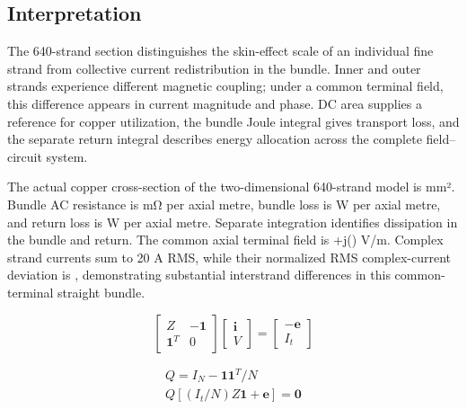 \hypertarget{04.interpretation.heading}{}
\subsection{Interpretation}

\hypertarget{04.interpretation.p1}{}
The 640-strand section distinguishes the skin-effect scale of an individual fine strand from collective current redistribution in the bundle. Inner and outer strands experience different magnetic coupling; under a common terminal field, this difference appears in current magnitude and phase. DC area supplies a reference for copper utilization, the bundle Joule integral gives transport loss, and the separate return integral describes energy allocation across the complete field–circuit system.

\hypertarget{04.quantitative.p1}{}
The actual copper cross-section of the two-dimensional 640-strand model is  mm². Bundle AC resistance is  mΩ per axial metre, bundle loss is  W per axial metre, and return loss is  W per axial metre. Separate integration identifies dissipation in the bundle and return. The common axial terminal field is +j() V/m. Complex strand currents sum to 20 A RMS, while their normalized RMS complex-current deviation is , demonstrating substantial interstrand differences in this common-terminal straight bundle.

\hypertarget{04.equation.E04}{}
\hypertarget{E04}{}\begin{equation}\begin{bmatrix} Z&-\mathbf1\\ \mathbf1^T&0\end{bmatrix}\begin{bmatrix}\mathbf i\\V\end{bmatrix}=\begin{bmatrix}-\mathbf e\\I_t\end{bmatrix}\tag{4}\label{eq:E04}\end{equation}

\hypertarget{04.equation.E05}{}
\hypertarget{E05}{}
\begin{equation}
\begin{gathered}
Q=I_N-\mathbf1\mathbf1^T/N \\
Q\left[(I_t/N)Z\mathbf1+\mathbf e\right]=\mathbf0
\end{gathered}
\tag{5}\label{eq:E05}
\end{equation}

